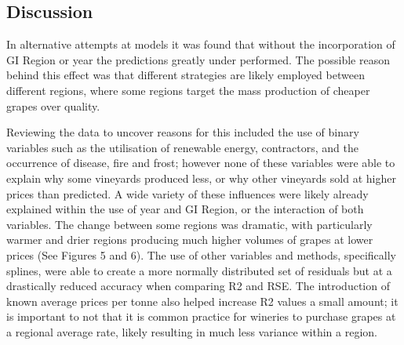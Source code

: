 \documentclass[review,12pt,authoryear]{elsarticle}
\begin{document}
\begin{linenumbers}
\section{Discussion}
% 
%
%
In alternative attempts at models it was found that without the incorporation of GI Region or year the predictions greatly under performed. The possible reason behind this effect was that different strategies are likely employed between different regions, where some regions target the mass production of cheaper grapes over quality. %
%



%
Reviewing the data to uncover reasons for this included the use of binary variables such as the utilisation of renewable energy, contractors, and the occurrence of disease, fire and frost; however none of these variables were able to explain why some vineyards produced less, or why other vineyards sold at higher prices than predicted. A wide variety of these influences were likely already explained within the use of year and GI Region, or the interaction of both variables. The change between some regions was dramatic, with particularly warmer and drier regions producing much higher volumes of grapes at lower prices (See Figures 5 and 6). The use of other variables and methods, specifically splines, were able to create a more normally distributed set of residuals but at a drastically reduced accuracy when comparing R2 and RSE. The introduction of known average prices per tonne also helped increase R2 values a small amount; it is important to not that it is common practice for wineries to purchase grapes at a regional average rate, likely resulting in much less variance within a region.


\end{linenumbers}
\end{document}
